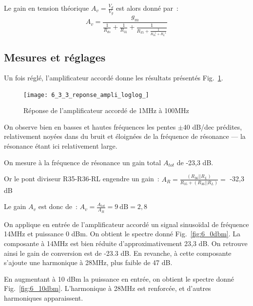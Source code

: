 \documentclass{article}
\begin{document}
Le gain en tension théorique $A_v=\frac{V_d}{V_g}$ est alors donné par~:
\begin{equation*}
A_v = \frac{g_m}{\frac{1}{R_{ds}}+\frac{1}{R_{31}}+\frac{1}{R_{35}+\frac{1}{R_{36}^{-1}+R_{L}^{-1}}}}
\end{equation*}


\subsection{Mesures et réglages}


Un fois réglé, l'amplificateur accordé donne les résultats présentés Fig.~\ref{fig:6loglog}.

\begin{figure}[h]
	\centering
	\texttt{[image: 6\_3\_3\_reponse\_ampli\_loglog\_]}
	\caption{Réponse de l'amplificateur accordé de 1MHz à 100MHz}
	\label{fig:6loglog}
\end{figure}

On observe bien en basses et hautes fréquences les pentes $\pm$40 dB/dec prédites, relativement noyées dans du bruit et éloignées de la fréquence de résonance --- la résonance étant ici relativement large.




On mesure à la fréquence de résonance un gain total $A_{tot}$ de -23,3 dB.

Or le pont diviseur R35-R36-RL engendre un gain~: $A_R = \frac{(R_{36}||R_L)}{R_{35}+(R_{36}||R_L)} = $ -32,3 dB

Le gain $A_v$ est donc de~: $A_v = \frac{A_{tot}}{A_R} = 9~\mathrm{dB} = 2,8$


On applique en entrée de l'amplificateur accordé un signal sinusoïdal de fréquence 14MHz et puissance 0 dBm. On obtient le spectre donné Fig.~\ref{fig:6_0dbm}. La composante à 14MHz est bien réduite d'approximativement 23,3 dB. On retrouve ainsi le gain de conversion est de -23.3 dB. En revanche, à cette composante s'ajoute une harmonique à 28MHz, plus faible de 47 dB.

En augmentant à 10 dBm la puissance en entrée, on obtient le spectre donné Fig.~\ref{fig:6_10dbm}. L'harmonique à 28MHz est renforcée, et d'autres harmoniques apparaissent.
\end{document}
